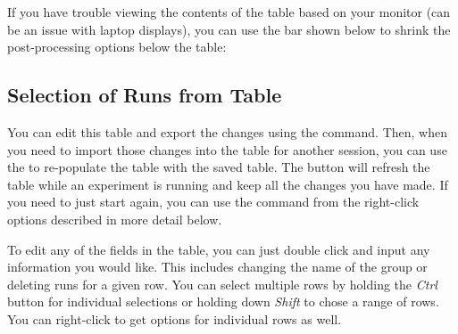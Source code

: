 \noindent{}

If you have trouble viewing the contents of the table based on your monitor (can be an issue with laptop displays), you can use the bar shown below to shrink the post-processing options below the table:

\noindent{}


\subsection{Selection of Runs from Table}

You can edit this table and export the changes using the  command. Then, when you need to import those changes into the table for another session, you can use the  to re-populate the table with the saved table. The  button will refresh the table while an experiment is running and keep all the changes you have made. If you need to just start again, you can use the  command from the right-click options described in more detail below. 

To edit any of the fields in the table, you can just double click and input any information you would like. This includes changing the name of the group or deleting runs for a given row. You can select multiple rows by holding the \textit{Ctrl} button for individual selections or holding down \textit{Shift} to chose a range of rows. You can right-click to get options for individual rows as well. 

